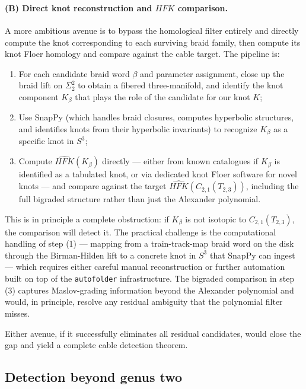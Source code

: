 \paragraph{(B) Direct knot reconstruction and $\widehat{HFK}$ comparison.}
A more ambitious avenue is to bypass the homological filter entirely and directly compute the knot corresponding to each surviving braid family, then compute its knot Floer homology and compare against the cable target. The pipeline is:
\begin{enumerate}
    \item For each candidate braid word $\beta$ and parameter assignment, close up the braid lift on $\Sigma_2^2$ to obtain a fibered three-manifold, and identify the knot component $K_\beta$ that plays the role of the candidate for our knot $K$;
    \item Use SnapPy \cite{SnapPy} (which handles braid closures, computes hyperbolic structures, and identifies knots from their hyperbolic invariants) to recognize $K_\beta$ as a specific knot in $S^3$;
    \item Compute $\widehat{HFK}(K_\beta)$ directly --- either from known catalogues if $K_\beta$ is identified as a tabulated knot, or via dedicated knot Floer software for novel knots --- and compare against the target $\widehat{HFK}(C_{2,1}(T_{2,3}))$, including the full bigraded structure rather than just the Alexander polynomial.
\end{enumerate}
This is in principle a complete obstruction: if $K_\beta$ is not isotopic to $C_{2,1}(T_{2,3})$, the comparison will detect it. The practical challenge is the computational handling of step (1) --- mapping from a train-track-map braid word on the disk through the Birman-Hilden lift to a concrete knot in $S^3$ that SnapPy can ingest --- which requires either careful manual reconstruction or further automation built on top of the \texttt{autofolder} infrastructure. The bigraded comparison in step (3) captures Maslov-grading information beyond the Alexander polynomial and would, in principle, resolve any residual ambiguity that the polynomial filter misses.

Either avenue, if it successfully eliminates all residual candidates, would close the gap and yield a complete cable detection theorem.

\subsection{Detection beyond genus two}

